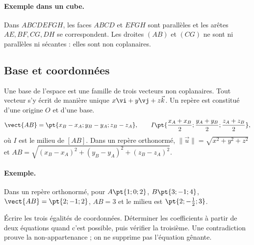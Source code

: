 \paragraph{Exemple dans un cube.} Dans $ABCDEFGH$, les faces $ABCD$ et $EFGH$ sont parallèles et les arêtes $AE,BF,CG,DH$ se correspondent. Les droites $(AB)$ et $(CG)$ ne sont ni parallèles ni sécantes : elles sont non coplanaires.
\subsection{Base et coordonnées}
Une base de l'espace est une famille de trois vecteurs non coplanaires. Tout vecteur s'y écrit de manière unique $x\vi +y\vj +z\vec k$. Un repère est constitué d'une origine $O$ et d'une base.
\[\vect{AB}=\pt{x_B-x_A;y_B-y_A;z_B-z_A},\qquad
I\pt{\frac{x_A+x_B}2;\frac{y_A+y_B}2;\frac{z_A+z_B}2},\]
où $I$ est le milieu de $[AB]$.
Dans un repère orthonormé, $\|\vec u\|=\sqrt{x^2+y^2+z^2}$ et $AB=\sqrt{(x_B-x_A)^2+(y_B-y_A)^2+(z_B-z_A)^2}$.
\paragraph{Exemple.} Dans un repère orthonormé, pour $A\pt{1;0;2}$, $B\pt{3;-1;4}$, $\vect{AB}=\pt{2;-1;2}$, $AB=3$ et le milieu est $\pt{2;-\frac{1}{2};3}$.
\begin{method}
Écrire les trois égalités de coordonnées. Déterminer les coefficients à partir de deux équations quand c'est possible, puis vérifier la troisième. Une contradiction prouve la non-appartenance ; on ne supprime pas l'équation gênante.
\end{method}



\mxnewpage
